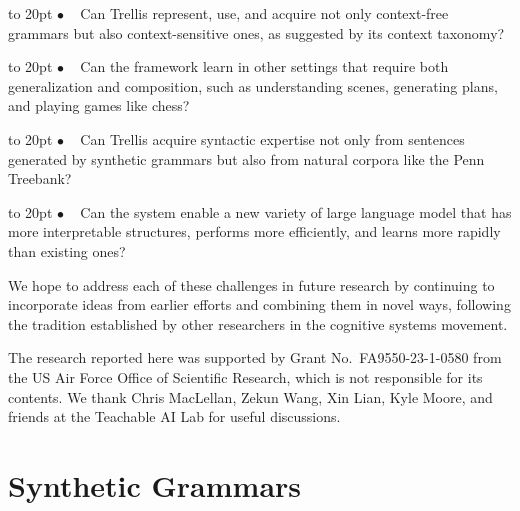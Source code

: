 \documentclass[11pt,letterpaper]{article}
\def\trellis/{{\sc Trellis}}
\def\texitem#1{\par\noindent\hangindent 20pt
               \hbox to 20pt {\hss #1 ~}\ignorespaces}
\def\bull{\texitem{$\bullet$}}
\begin{document}
\bull
Can \trellis/ represent, use, and acquire not only context-free grammars
but also context-sensitive ones, as suggested by its context taxonomy?

\bull
Can the framework learn in other settings that require both generalization
and composition, such as understanding scenes, generating plans, and
playing games like chess?

\bull
Can \trellis/ acquire syntactic expertise not only from sentences 
generated by synthetic grammars but also from natural corpora like 
the Penn Treebank?

\bull
Can the system enable a new variety of large language model that 
has more interpretable structures, performs more efficiently, and 
learns more rapidly than existing ones?

\vskip 0.05in
\noindent
We hope to address each of these challenges in future research by
continuing to incorporate ideas from earlier efforts and combining
them in novel ways, following the tradition established by other
researchers in the cognitive systems movement.

\begin{acknowledgements}
\noindent
The research reported here was supported by Grant No.\ FA9550-23-1-0580
from the US Air Force Office of Scientific Research, which is not
responsible for its contents. We thank Chris MacLellan, Zekun Wang, 
Xin Lian, Kyle Moore, and friends at the Teachable AI Lab for 
useful discussions.
\end{acknowledgements}

\newpage

{\parindent -10pt\leftskip 10pt\noindent



}

\newpage

\appendix

\section{Synthetic Grammars}
\label{app:grammars}
\end{document}
